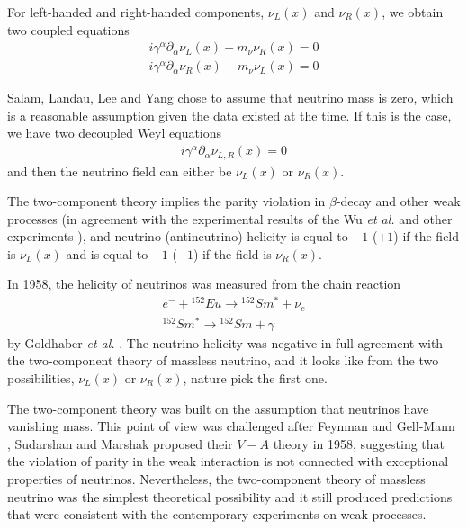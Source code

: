\documentclass[english]{article}
\begin{document}
    For left-handed and right-handed components, $\nu_{L} (x)$ and  $\nu_{R} (x)$, we obtain two coupled equations
    \begin{gather}
    	i\gamma^{\alpha} \partial_{\alpha} \nu_{L} (x) - m_{\nu} \nu_{R} (x) = 0 \\
        i\gamma^{\alpha} \partial_{\alpha} \nu_{R} (x) - m_{\nu} \nu_{L} (x) = 0
    \end{gather}
    
    Salam, Landau, Lee and Yang chose to assume that neutrino mass is zero, which is a reasonable assumption given the data existed at the time. If this is the case, we have two decoupled Weyl equations
    \begin{gather}
    	i\gamma^{\alpha} \partial_{\alpha} \nu_{L,R} (x) = 0
    \end{gather}
    and then the neutrino field can either be $\nu_{L} (x)$ or $\nu_{R} (x)$.
    
    The two-component theory implies the parity violation in $\beta$-decay and other weak processes (in agreement with the experimental results of the Wu \textit{et al.} and other experiments \cite{wu1957} \cite{garwinledermanweinrich1957}), and neutrino (antineutrino) helicity is equal to $-1$ ($+1$) if the field is $\nu_{L} (x)$ and is equal to $+1$ ($-1$) if the field is $\nu_{R} (x)$.
    
    In 1958, the helicity of neutrinos was measured from the chain reaction
    \begin{gather}
    	e^{-} + {}^{152} Eu \rightarrow {}^{152} Sm^{*} + \nu_{e} \\
        {}^{152} Sm^{*} \rightarrow {}^{152} Sm + \gamma
    \end{gather}
    by Goldhaber \textit{et al.} \cite{goldhabergrodzinssunyar1958}. The neutrino helicity was negative in full agreement with the two-component theory of massless neutrino, and it looks like from the two possibilities, $\nu_{L} (x)$ or $\nu_{R} (x)$, nature pick the first one.
    
    The two-component theory was built on the assumption that neutrinos have vanishing mass. This point of view was challenged after Feynman and Gell-Mann \cite{feynmangellmann1958}, Sudarshan and Marshak \cite{sudarshanmarshak1958} proposed their $ V - A$ theory in 1958, suggesting that the violation of parity in the weak interaction is not connected with exceptional properties of neutrinos. Nevertheless, the two-component theory of massless neutrino was the simplest theoretical possibility and it still produced predictions that were consistent with the contemporary experiments on weak processes.
    
\end{document}
